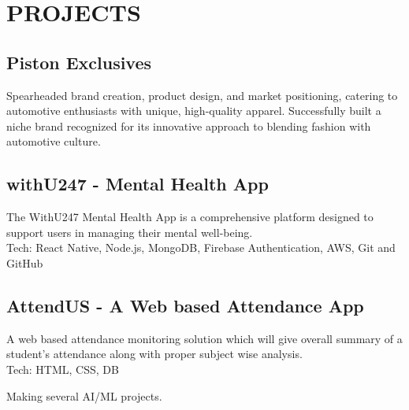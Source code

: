 \documentclass{article}
\begin{document}
\section*{PROJECTS}

\subsection*{Piston Exclusives}

Spearheaded brand creation, product design, and market positioning, catering to automotive enthusiasts with unique, high-quality apparel. Successfully built a niche brand recognized for its innovative approach to blending fashion with automotive culture.

\subsection*{withU247 - Mental Health App}

The WithU247 Mental Health App is a comprehensive platform designed to support users in managing their mental well-being. \\
Tech: React Native, Node.js, MongoDB, Firebase Authentication, AWS, Git and GitHub

\subsection*{AttendUS - A Web based Attendance App}

A web based attendance monitoring solution which will give overall summary of a student's attendance along with proper subject wise analysis. \\
Tech: HTML, CSS, DB

Making several AI/ML projects.
\end{document}
